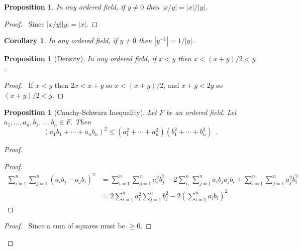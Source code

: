 \documentclass{article}
\let\qed\relax
\newtheorem{proposition}[axiom]{Proposition}
\newtheorem{corollary}{Corollary}[axiom]
\theoremstyle{definition}
\newcommand{\inv}[1]{\ensuremath{{#1}^{-1}}}
\begin{document}
    \begin{proposition}
        In any ordered field, if $y \neq 0$ then $|x/y| = |x|/|y|$.
    \end{proposition}

    \begin{proof}
        \pf\ Since $|x/y||y| = |x|$. \qed
    \end{proof}

    \begin{corollary}
        In any ordered field, if $y \neq 0$ then $|\inv{y}| = 1 / |y|$.
    \end{corollary}

    \begin{proposition}[Density]
        In any ordered field, if $x < y$ then $x < (x+y)/2 < y$.
    \end{proposition}

    \begin{proof}
        \pf\ If $x < y$ then $2x < x+y$ so $x < (x+y)/2$, and $x + y < 2y$ so $(x+y)/2 < y$. \qed
    \end{proof}

    \begin{proposition}[Cauchy-Schwarz Inequality]
        Let $F$ be an ordered field. Let $a_1, \ldots, a_n, b_1, \ldots, b_n \in F$. Then
        \[ (a_1 b_1 + \cdots + a_n b_n)^2 \leq (a_1^2 + \cdots + a_n^2)(b_1^2 + \cdots + b_n^2) \enspace . \]
    \end{proposition}

    \begin{proof}
        \pf
        \begin{proof}
            \pf
            \begin{align*}
                \sum_{i=1}^n \sum_{j=1}^n (a_i b_j - a_j b_i)^2
                & = \sum_{i=1}^n \sum_{j=1}^n a_i^2 b_j^2 - 2 \sum_{i_1}^n \sum_{j=1}^n
                a_i b_j a_j b_i + \sum_{i=1}^n \sum_{j=1}^n a_j^2 b_i^2 \\
                & = 2 \sum_{i=1}^n a_i^2 \sum_{j=1}^n b_j^2 - 2 \left( \sum_{i=1}^n a_i b_i \right)^2
            \end{align*}
        \end{proof}
        \qedstep
        \begin{proof}
            \pf\ Since a sum of squares must be $\geq 0$.
        \end{proof}
        \qed
    \end{proof}
\end{document}
